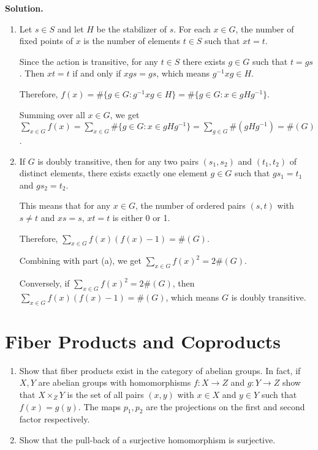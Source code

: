 \noindent\textbf{Solution.}
\begin{enumerate}[label=(\alph*)]
\item Let $s \in S$ and let $H$ be the stabilizer of $s$. For each $x \in G$, the number of fixed points of $x$ is the number of elements $t \in S$ such that $xt = t$.

Since the action is transitive, for any $t \in S$ there exists $g \in G$ such that $t = gs$. Then $xt = t$ if and only if $xgs = gs$, which means $g^{-1}xg \in H$.

Therefore, $f(x) = \#\{g \in G : g^{-1}xg \in H\} = \#\{g \in G : x \in gHg^{-1}\}$.

Summing over all $x \in G$, we get $\sum_{x \in G} f(x) = \sum_{x \in G} \#\{g \in G : x \in gHg^{-1}\} = \sum_{g \in G} \#(gHg^{-1}) = \#(G)$.

\item If $G$ is doubly transitive, then for any two pairs $(s_1, s_2)$ and $(t_1, t_2)$ of distinct elements, there exists exactly one element $g \in G$ such that $gs_1 = t_1$ and $gs_2 = t_2$.

This means that for any $x \in G$, the number of ordered pairs $(s, t)$ with $s \neq t$ and $xs = s$, $xt = t$ is either 0 or 1.

Therefore, $\sum_{x \in G} f(x)(f(x)-1) = \#(G)$.

Combining with part (a), we get $\sum_{x \in G} f(x)^2 = 2\#(G)$.

Conversely, if $\sum_{x \in G} f(x)^2 = 2\#(G)$, then $\sum_{x \in G} f(x)(f(x)-1) = \#(G)$, which means $G$ is doubly transitive.
\end{enumerate}

\section{Fiber Products and Coproducts}

\begin{problembox}
\begin{enumerate}[label=(\alph*)]
\item Show that fiber products exist in the category of abelian groups. In fact, if $X, Y$ are abelian groups with homomorphisms $f: X \rightarrow Z$ and $g: Y \rightarrow Z$ show that $X \times_Z Y$ is the set of all pairs $(x, y)$ with $x \in X$ and $y \in Y$ such that $f(x) = g(y)$. The maps $p_1, p_2$ are the projections on the first and second factor respectively.
\item Show that the pull-back of a surjective homomorphism is surjective.
\end{enumerate}
\end{problembox}

